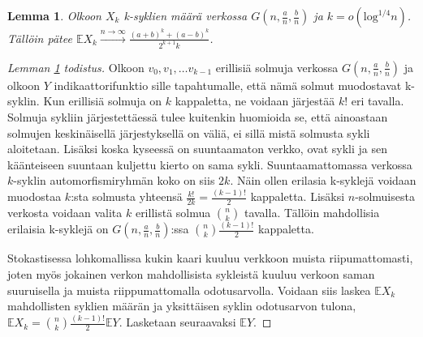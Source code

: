\documentclass[finnish,12pt,a4paper,pdftex,sci,utf8]{aaltothesis}
\newtheorem{lemma}{Lemma}
\begin{document}
\begin{lemma}
	\label{lemma:k-syklit_odotus}
	Olkoon $X_k$ k-syklien määrä verkossa $G(n,\frac{a}{n},\frac{b}{n})$ ja $k = o(\text{log}^{1/4}n)$. Tällöin pätee $\mathbb{E}X_k \xrightarrow{n \rightarrow \infty} \frac{(a+b)^k + (a-b)^k}{2^{k+1}k}$. 
\end{lemma}


\begin{proof}[Lemman \ref{lemma:k-syklit_odotus} todistus]
	Olkoon $v_0, v_1, \ldots v_{k-1}$ erillisiä solmuja verkossa $G(n,\frac{a}{n},\frac{b}{n})$ ja olkoon $Y$ indikaattorifunktio sille tapahtumalle, että nämä solmut muodostavat k-syklin. Kun erillisiä solmuja on $k$ kappaletta, ne voidaan järjestää $k!$ eri tavalla. Solmuja sykliin järjestettäessä tulee kuitenkin huomioida se, että ainoastaan solmujen keskinäisellä järjestyksellä on väliä, ei sillä mistä solmusta sykli aloitetaan. Lisäksi koska kyseessä on suuntaamaton verkko, ovat sykli ja sen käänteiseen suuntaan kuljettu kierto on sama sykli. Suuntaamattomassa verkossa $k$-syklin automorfismiryhmän koko on siis $2k$. Näin ollen erilasia k-syklejä voidaan muodostaa $k$:sta solmusta yhteensä $\frac{k!}{2k} = \frac{(k-1)!}{2}$ kappaletta. Lisäksi $n$-solmuisesta verkosta voidaan valita $k$ erillistä solmua $\binom{n}{k}$ tavalla. Tällöin mahdollisia erilaisia k-syklejä on $G(n,\frac{a}{n},\frac{b}{n})$:ssa $\binom{n}{k} \frac{(k-1)!}{2}$ kappaletta.
	
	Stokastisessa lohkomallissa kukin kaari kuuluu verkkoon muista riipumattomasti, joten myös jokainen verkon mahdollisista sykleistä kuuluu verkoon saman suuruisella ja muista riippumattomalla odotusarvolla. Voidaan siis laskea $\mathbb{E}X_k$ mahdollisten syklien määrän ja yksittäisen syklin odotusarvon tulona, $\mathbb{E}X_k = \binom{n}{k} \frac{(k-1)!}{2} \mathbb{E}Y$. Lasketaan seuraavaksi $\mathbb{E}Y$.


\end{proof}
\end{document}
